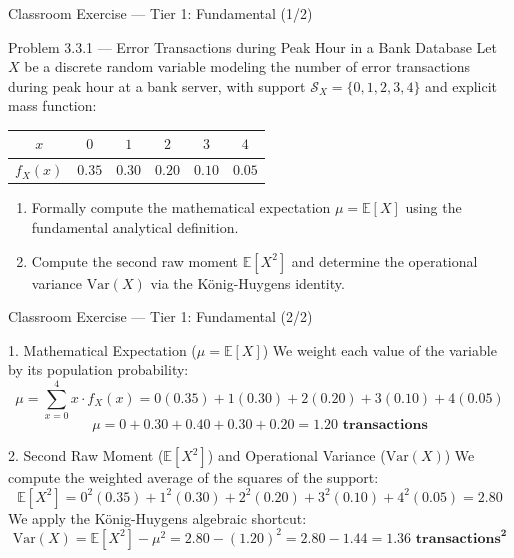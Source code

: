 \documentclass[aspectratio=169,xcolor={dvipsnames,table}]{beamer}
\begin{document}
\begin{frame}{Classroom Exercise --- Tier 1: Fundamental (1/2)}
	\begin{block}{Problem 3.3.1 --- Error Transactions during Peak Hour in a Bank Database}
		\footnotesize
		Let $X$ be a discrete random variable modeling the number of error transactions during peak hour at a bank server, with support $\mathcal{S}_X = \{0, 1, 2, 3, 4\}$ and explicit mass function:
		\begin{table}[h]
			\centering
			\begin{tabular}{c|ccccc}
				\toprule
				$x$ & $0$ & $1$ & $2$ & $3$ & $4$ \\
				\midrule
				$f_X(x)$ & $0.35$ & $0.30$ & $0.20$ & $0.10$ & $0.05$ \\
				\bottomrule
			\end{tabular}
		\end{table}
		\begin{enumerate}\itemsep=0.1cm
			\item Formally compute the mathematical expectation $\mu = \mathbb{E}[X]$ using the fundamental analytical definition.
			\item Compute the second raw moment $\mathbb{E}[X^2]$ and determine the operational variance $\text{Var}(X)$ via the König-Huygens identity.
		\end{enumerate}
	\end{block}
\end{frame}

\begin{frame}{Classroom Exercise --- Tier 1: Fundamental (2/2)}
	\fontsize{6.8pt}{8.2pt}\selectfont
	\begin{block}{1. Mathematical Expectation ($\mu = \mathbb{E}[X]$)}
		\fontsize{6.8pt}{8.2pt}\selectfont
		We weight each value of the variable by its population probability:
		$$\mu = \sum_{x=0}^4 x \cdot f_X(x) = 0(0.35) + 1(0.30) + 2(0.20) + 3(0.10) + 4(0.05)$$
		$$\mu = 0 + 0.30 + 0.40 + 0.30 + 0.20 = \mathbf{1.20\text{ transactions}}$$
	\end{block}

	\vspace{-0.15cm}
	\pause
	\begin{alertblock}{2. Second Raw Moment ($\mathbb{E}[X^2]$) and Operational Variance ($\text{Var}(X)$)}
		\fontsize{6.8pt}{8.2pt}\selectfont
		We compute the weighted average of the squares of the support:
		$$\mathbb{E}[X^2] = 0^2(0.35) + 1^2(0.30) + 2^2(0.20) + 3^2(0.10) + 4^2(0.05) = \mathbf{2.80}$$
		We apply the König-Huygens algebraic shortcut:
		$$\text{Var}(X) = \mathbb{E}[X^2] - \mu^2 = 2.80 - (1.20)^2 = 2.80 - 1.44 = \mathbf{1.36\text{ transactions}^2}$$
	\end{alertblock}
\end{frame}
\end{document}
